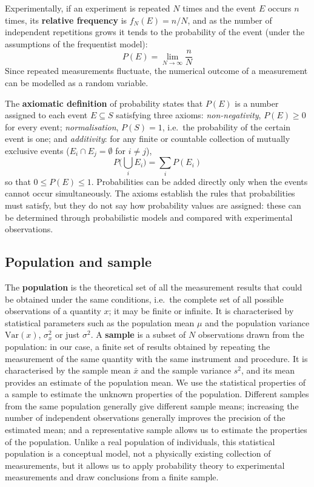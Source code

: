 \documentclass[letterpaper,11pt,leqno]{book}
\begin{document}
Experimentally, if an experiment is repeated $N$ times and the event $E$ occurs $n$ times, its \textbf{relative frequency} is $f_N(E) = n/N$, and as the number of independent repetitions grows it tends to the probability of the event (under the assumptions of the frequentist model):
\begin{equation}
\boxed{P(E) = \lim_{N \to \infty}\frac{n}{N}}
\label{eq:frequentist_probability}
\end{equation}
Since repeated measurements fluctuate, the numerical outcome of a measurement can be modelled as a random variable.

The \textbf{axiomatic definition} of probability states that $P(E)$ is a number assigned to each event $E \subseteq S$ satisfying three axioms: \emph{non-negativity}, $P(E) \ge 0$ for every event; \emph{normalisation}, $P(S) = 1$, i.e.\ the probability of the certain event is one; and \emph{additivity}: for any finite or countable collection of mutually exclusive events ($E_i \cap E_j = \emptyset$ for $i \neq j$),
\begin{equation}
\boxed{P\Big(\bigcup_i E_i\Big) = \sum_i P(E_i)}
\label{eq:additivity}
\end{equation}
so that $0 \le P(E) \le 1$. Probabilities can be added directly only when the events cannot occur simultaneously. The axioms establish the rules that probabilities must satisfy, but they do not say how probability values are assigned: these can be determined through probabilistic models and compared with experimental observations.

\subsection{Population and sample}
\label{sec:population_sample}

The \textbf{population} is the theoretical set of all the measurement results that could be obtained under the same conditions, i.e.\ the complete set of all possible observations of a quantity $x$; it may be finite or infinite. It is characterised by statistical parameters such as the population mean $\mu$ and the population variance $\text{Var}(x)$, $\sigma_x^2$ or just $\sigma^2$. A \textbf{sample} is a subset of $N$ observations drawn from the population: in our case, a finite set of results obtained by repeating the measurement of the same quantity with the same instrument and procedure. It is characterised by the sample mean $\bar{x}$ and the sample variance $s^2$, and its mean provides an estimate of the population mean. We use the statistical properties of a sample to estimate the unknown properties of the population. Different samples from the same population generally give different sample means; increasing the number of independent observations generally improves the precision of the estimated mean; and a representative sample allows us to estimate the properties of the population. Unlike a real population of individuals, this statistical population is a conceptual model, not a physically existing collection of measurements, but it allows us to apply probability theory to experimental measurements and draw conclusions from a finite sample.
\end{document}
